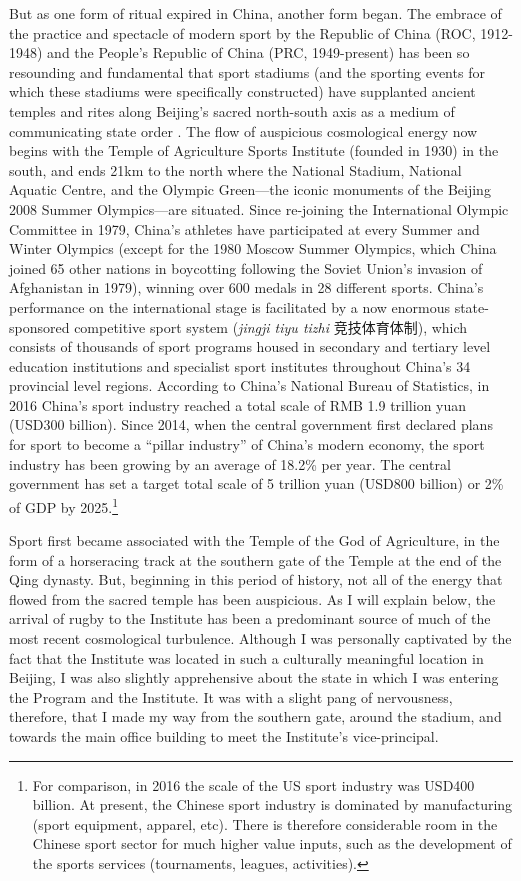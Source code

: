 \begin{CJK}{UTF8}{gbsn}
But as one form of ritual expired in China, another form began.
The embrace of the practice and spectacle of modern sport by the Republic of China (ROC, 1912-1948) and the People's Republic of China (PRC, 1949-present) has been so resounding and fundamental that sport stadiums (and the sporting events for which these stadiums were specifically constructed) have supplanted ancient temples and rites along Beijing's sacred north-south axis as a medium of communicating state order \citep{Brownell1995}.  The flow of auspicious cosmological energy now begins with the Temple of Agriculture Sports Institute (founded in 1930) in the south, and ends 21km to the north where the National Stadium, National Aquatic Centre, and the Olympic Green---the iconic monuments of the Beijing 2008 Summer Olympics---are situated.  Since re-joining the International Olympic Committee in 1979, China's athletes have participated at every Summer and Winter Olympics (except for the 1980 Moscow Summer Olympics, which China joined 65 other nations in boycotting following the Soviet Union's invasion of Afghanistan in 1979), winning over 600 medals in 28 different sports.  China's performance on the international stage is facilitated by a now enormous state-sponsored competitive sport system (\textit{jingji tiyu tizhi} 竞技体育体制), which consists of thousands of sport programs housed in secondary and tertiary level education institutions and specialist sport institutes throughout China's 34 provincial level regions.  According to China's National Bureau of Statistics, in 2016 China's sport industry reached a total scale of RMB 1.9 trillion yuan (USD300 billion).  Since 2014, when the central government first declared plans for sport to become a ``pillar industry'' of China's modern economy, the sport industry has been growing by an average of 18.2\% per year.  The central government has set a target total scale of 5 trillion yuan (USD800 billion) or 2\% of GDP by 2025.\footnote{For comparison, in 2016 the scale of the US sport industry was USD400 billion. At present, the Chinese sport industry is dominated by manufacturing (sport equipment, apparel, etc).  There is therefore considerable room in the Chinese sport sector for much higher value inputs, such as the development of the sports services (tournaments, leagues, activities).}

Sport first became associated with the Temple of the God of Agriculture, in the form of a horseracing track at the southern gate of the Temple at the end of the Qing dynasty. But, beginning in this period of history, not all of the energy that flowed from the sacred temple has been auspicious.  As I will explain below, the arrival of rugby to the Institute has been a predominant source of much of the most recent cosmological turbulence.  Although I was personally captivated by the fact that the Institute was located in such a culturally meaningful location in Beijing, I was also slightly apprehensive about the state in which I was entering the Program and the Institute.  It was with a slight pang of nervousness, therefore, that I made my way from the southern gate, around the stadium, and towards the main office building to meet the Institute's vice-principal.


\end{CJK}
